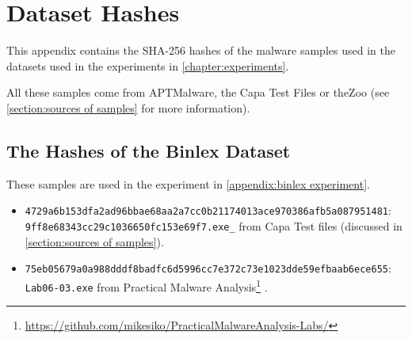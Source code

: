 \chapter{Dataset Hashes}\label{appendix:hashes}
This appendix contains the SHA-256 hashes of the malware samples used in the datasets used in the experiments in \autoref{chapter:experiments}.

All these samples come from APTMalware, the Capa Test Files or theZoo (see \autoref{section:sources of samples} for more information).






\section{The Hashes of the Binlex Dataset}\label{appendix:hashes binlex}
These samples are used in the experiment in \autoref{appendix:binlex experiment}.

\begin{itemize}
    \item \texttt{\footnotesize 4729a6b153dfa2ad96bbae68aa2a7cc0b21174013ace970386afb5a087951481}: \\ \texttt{9ff8e68343cc29c1036650fc153e69f7.exe\_} from Capa Test files (discussed in \autoref{section:sources of samples}).

    \item \texttt{\footnotesize 75eb05679a0a988dddf8badfc6d5996cc7e372c73e1023dde59efbaab6ece655}: \\ \texttt{Lab06-03.exe} from Practical Malware Analysis\footnote{\tiny \url{https://github.com/mikesiko/PracticalMalwareAnalysis-Labs/}} \cite{practical-malware-analysis}.
\end{itemize}
